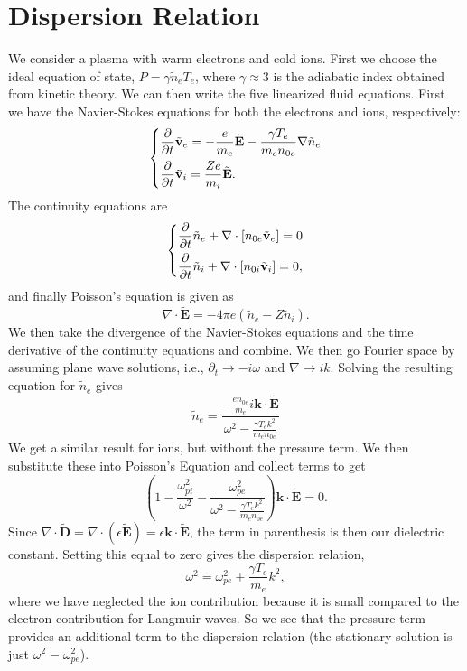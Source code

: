 \documentclass[12pt]{article}
\newcommand{\p}{\partial}
\newcommand{\mb}{\mathbf}
\begin{document}
\section*{Dispersion Relation}
We consider a plasma with warm electrons and cold ions. First we choose the ideal equation of state, $P=\gamma \tilde{n}_e T_e$, where $\gamma \approx 3$ is the adiabatic index obtained from kinetic theory. We can then write the five linearized fluid equations. First we have the Navier-Stokes equations for both the electrons and ions, respectively:
\[
	\begin{dcases}
		\frac{\p}{\p t}\tilde{\mb{v}}_e=-\frac{e}{m_e}\tilde{\mb{E}}-\frac{\gamma T_e}{m_e n_{0e}}\nabla \tilde{n}_e\\
		\frac{\p}{\p t} \tilde{\mb{v}}_i=\frac{Ze}{m_i}\tilde{\mb{E}}.
	\end{dcases}
\]
The continuity equations are
\[
	\begin{dcases}
		\frac{\p}{\p t}\tilde{n}_e+\nabla \cdot [n_{0e}\tilde{\mb{v}}_e]=0\\
		\frac{\p}{\p t}\tilde{n}_i+\nabla \cdot [n_{0i}\tilde{\mb{v}}_i]=0,
	\end{dcases}
\]
and finally Poisson's equation is given as
\[
	\nabla \cdot \tilde{\mb{E}}=-4 \pi e (\tilde{n}_e-Z\tilde{n}_i).
\]
We then take the divergence of the Navier-Stokes equations and the time derivative of the continuity equations and combine. We then go Fourier space by assuming plane wave solutions, i.e., $\p_t \rightarrow -i\omega$ and $\nabla \rightarrow ik$. Solving the resulting equation for $\tilde{n}_e$ gives
\[
	\tilde{n}_e=\frac{-\frac{e n_{0e}}{m_e}i\mb{k}\cdot\tilde{\mb{E}}}{\omega^2-\frac{\gamma T_e k^2}{m_e n_{0e}}}
\]
We get a similar result for ions, but without the pressure term. We then substitute these into Poisson's Equation and collect terms to get
\[
	\left( 1-\frac{\omega_{pi}^2}{\omega ^2}-\frac{\omega_{pe}^2}{\omega^2-\frac{\gamma T_e k^2}{m_e n_{0e}}}\right) \mb{k}\cdot\tilde{\mb{E}}=0.
\]
Since $\nabla \cdot \tilde{\mb{D}} = \nabla \cdot (\epsilon \tilde{\mb{E}}) = \epsilon \mb{k} \cdot \tilde{\mb{E}}$, the term in parenthesis is then our dielectric constant. Setting this equal to zero gives the dispersion relation,
\[
	\omega^2=\omega_{pe}^2+\frac{\gamma T_e}{m_e} k^2,
\]
where we have neglected the ion contribution because it is small compared to the electron contribution for Langmuir waves. So we see that the pressure term provides an additional term to the dispersion relation (the stationary solution is just $\omega^2=\omega_{pe}^2$).
\end{document}
